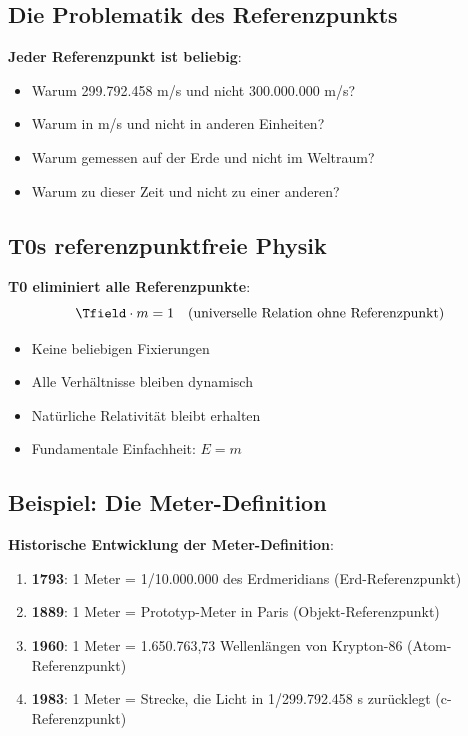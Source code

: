 	\subsection{Die Problematik des Referenzpunkts}
	
	\textbf{Jeder Referenzpunkt ist beliebig}:
	\begin{itemize}
		\item Warum 299.792.458 m/s und nicht 300.000.000 m/s?
		\item Warum in m/s und nicht in anderen Einheiten?
		\item Warum gemessen auf der Erde und nicht im Weltraum?
		\item Warum zu dieser Zeit und nicht zu einer anderen?
	\end{itemize}
	
	\subsection{T0s referenzpunktfreie Physik}
	
	\textbf{T0 eliminiert alle Referenzpunkte}:
	\begin{equation}
		\Tfield \cdot m = 1 \quad \text{(universelle Relation ohne Referenzpunkt)}
	\end{equation}
	
	\begin{itemize}
		\item Keine beliebigen Fixierungen
		\item Alle Verhältnisse bleiben dynamisch
		\item Natürliche Relativität bleibt erhalten
		\item Fundamentale Einfachheit: $E = m$
	\end{itemize}
	
	\subsection{Beispiel: Die Meter-Definition}
	
	\textbf{Historische Entwicklung der Meter-Definition}:
	\begin{enumerate}
		\item \textbf{1793}: 1 Meter = 1/10.000.000 des Erdmeridians (Erd-Referenzpunkt)
		\item \textbf{1889}: 1 Meter = Prototyp-Meter in Paris (Objekt-Referenzpunkt)  
		\item \textbf{1960}: 1 Meter = 1.650.763,73 Wellenlängen von Krypton-86 (Atom-Referenzpunkt)
		\item \textbf{1983}: 1 Meter = Strecke, die Licht in 1/299.792.458 s zurücklegt (c-Referenzpunkt)
	\end{enumerate}
	
